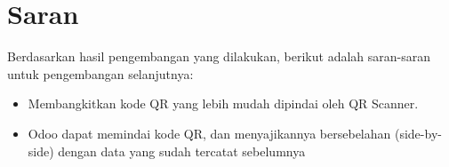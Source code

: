 \section{Saran}
\label{sec:saran}
Berdasarkan hasil pengembangan yang dilakukan, berikut adalah saran-saran untuk pengembangan selanjutnya:

\begin{itemize}
	\item Membangkitkan kode QR yang lebih mudah dipindai oleh QR Scanner.
	\item Odoo dapat memindai kode QR, dan menyajikannya bersebelahan (side-by-side) dengan data yang sudah tercatat sebelumnya
\end{itemize}

